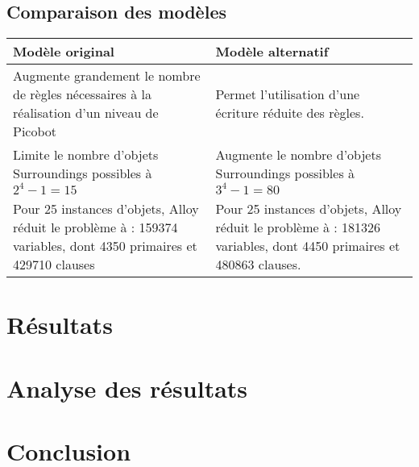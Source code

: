 \documentclass{article}
\begin{document}
\subsection{Comparaison des modèles}
\begin{tabular}{|M{8cm}|M{8cm}|}
    \hline
    \textbf{Modèle original} & \textbf{Modèle alternatif} \tabularnewline
    \hline
    Augmente grandement le nombre de règles nécessaires à la réalisation d'un niveau de Picobot & Permet l'utilisation d'une écriture réduite des règles. \tabularnewline
    \hline
    Limite le nombre d'objets Surroundings possibles à $2^4-1=15$ & Augmente le nombre d'objets Surroundings possibles à $3^4-1=80$
 \tabularnewline
    \hline
    Pour 25 instances d'objets, Alloy réduit le problème à :
159374 variables, dont 4350 primaires et 429710 clauses & Pour 25 instances d’objets, Alloy réduit le problème à :
181326 variables, dont 4450 primaires et 480863 clauses. \tabularnewline
    \hline
    \end{tabular}

\section{Résultats}
\section{Analyse des résultats}
\section{Conclusion}
\end{document}
